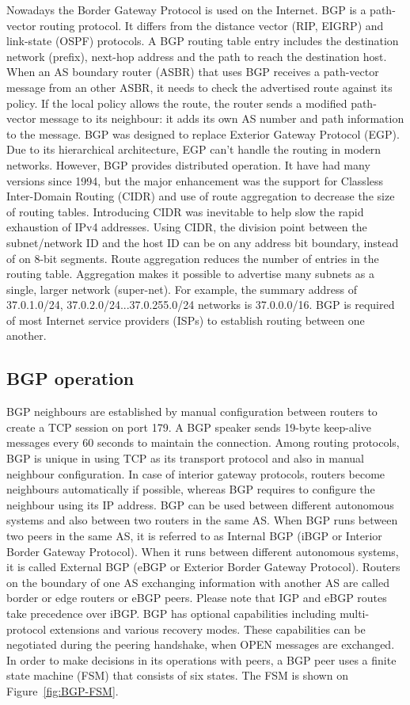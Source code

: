 \documentclass[a4paper]{article}
\begin{document}
Nowadays the Border Gateway Protocol is used on the Internet. BGP is a path-vector routing protocol. It differs from
the distance vector (RIP, EIGRP) and link-state (OSPF) protocols. A BGP routing table entry includes the destination
network (prefix), next-hop address and the path to reach the destination host. When an AS boundary router (ASBR) that
uses BGP receives a path-vector message from an other ASBR, it needs to check the advertised route against its policy.
If the local policy allows the route, the router sends a modified path-vector message to its neighbour: it adds its own
AS number and path information to the message.
BGP was designed to replace Exterior Gateway Protocol (EGP). Due to its hierarchical architecture, EGP can't handle the
routing in modern networks. However, BGP provides distributed operation. It have had many versions since 1994, but the
major enhancement was the support for Classless Inter-Domain Routing (CIDR) and use of route aggregation to decrease
the size of routing tables. Introducing CIDR was inevitable to help slow the rapid exhaustion of IPv4 addresses. Using
CIDR, the division point between the subnet/network ID and the host ID can be on any address bit boundary, instead of
on 8-bit segments. Route aggregation reduces the number of entries in the routing table. Aggregation makes it possible
to advertise many subnets as a single, larger network (super-net). For example, the summary address of 37.0.1.0/24,
37.0.2.0/24...37.0.255.0/24 networks is 37.0.0.0/16. BGP is required of most Internet service providers (ISPs) to
establish routing between one another.

\subsection{BGP operation}

BGP neighbours are established by manual configuration between routers to create a TCP session on port 179. A BGP
speaker sends 19-byte keep-alive messages every 60 seconds to maintain the connection. Among routing protocols, BGP is
unique in using TCP as its transport protocol and also in manual neighbour configuration. In case of interior gateway
protocols, routers become neighbours automatically if possible, whereas BGP requires to configure the neighbour using its
IP address. BGP can be used between different autonomous systems and also between two routers in the same AS. When BGP
runs between two peers in the same AS, it is referred to as Internal BGP (iBGP or Interior Border Gateway Protocol).
When it runs between different autonomous systems, it is called External BGP (eBGP or Exterior Border Gateway
Protocol). Routers on the boundary of one AS exchanging information with another AS are called border or edge routers
or eBGP peers. Please note that IGP and eBGP routes take precedence over iBGP. BGP has optional capabilities including
multi-protocol extensions and various recovery modes. These capabilities can be negotiated during the peering
handshake, when OPEN messages are exchanged. In order to make decisions in its operations with peers, a BGP peer uses a
finite state machine (FSM) that consists of six states. The FSM is shown on Figure~\ref{fig:BGP-FSM}.
\end{document}
